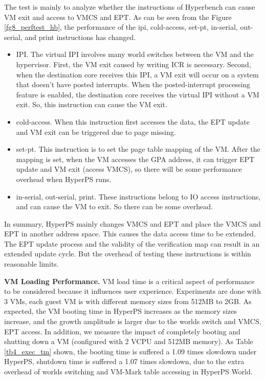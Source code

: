 \documentclass[10pt, numbers, preprint ]{sigplanconf}
\begin{document}
{The test is mainly to analyze whether the instructions of Hyperbench can cause VM exit and access to VMCS and EPT. As can be seen from the Figure \ref{fg8_perftest_hb}, the performance of the ipi, cold-access, set-pt, in-serial, out-serial, and print instructions has changed.

\begin{itemize}
	\item IPI. The virtual IPI involves many world switches between the VM and the hypervisor. First, the VM exit caused by writing ICR is necessary. Second, when the destination core receives this IPI, a VM exit will occur on a system that doesn’t have posted interrupts. When the posted-interrupt processing feature is enabled, the destination core receives the virtual IPI without a VM exit. So, this instruction can cause the VM exit.
	\item cold-access. When this instruction first accesses the data, the EPT update and VM exit can be triggered due to page missing.
	\item set-pt. This instruction is to set the page table mapping of the VM. After the mapping is set, when the VM accesses the GPA address, it can trigger EPT update and VM exit (access VMCS), so there will be some performance overhead when HyperPS runs.
	\item in-serial, out-serial, print. These instructions belong to IO access instructions, and can cause the VM to exit. So there can be some overhead.
\end{itemize}

In summary, HyperPS mainly changes VMCS and EPT and place the VMCS and EPT in another address space. This causes the data access time to be extended. The EPT update process and the validity of the verification map can result in an extended update cycle. But the overhead of testing these instructions is within reasonable limits.

\textbf{VM Loading Performance.} VM load time is a critical aspect of performance to be considered because it influences user experience. Experiments are done with 3 VMs, each guest VM is with different memory sizes from 512MB to 2GB. As expected, the VM booting time in HyperPS increases as the memory sizes increase, and the growth amplitude is larger due to the worlds switch and VMCS, EPT access. In addition, we measure the impact of completely booting and shutting down a VM (configured with 2 VCPU and 512MB memory). As Table \ref{tb4_exec_tm} shown, the booting time is suffered a 1.09 times slowdown under HyperPS, shutdown time is suffered a 1.07 times slowdown, due to the extra overhead of worlds switching and VM-Mark table accessing in HyperPS World.

}
\end{document}
